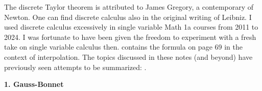 \documentclass[12pt]{amsart}
\begin{document}
The discrete Taylor theorem is attributed to James Gregory, 
a contemporary of Newton. One can find discrete calculus also in the original writing of Leibniz.
I used discrete calculus excessively in single variable Math 1a courses from 2011 to 2024. I was
fortunate to have been given the freedom to experiment with a fresh take on single variable calculus then. 
\cite{VanderWaerdenAlgebra} contains the formula on page 69 in the context of interpolation. 
The topics discussed in these notes (and beyond) have previously seen attempts to be summarized:
\cite{knillcalculus,KnillILAS,KnillBaltimore,AmazingWorld,LusternikSchnirelmann2024,DehnSommervilleManifolds,Simon2026}. \\

{\bf 1. Gauss-Bonnet} \\
\end{document}
